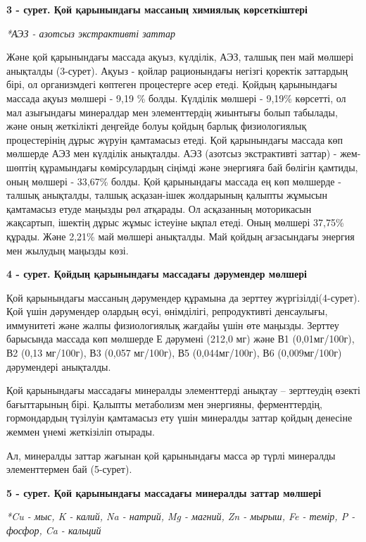 {\bfseries 3 - сурет. Қой қарынындағы массаның химиялық көрсеткіштері}

\emph{*АЭЗ - азотсыз экстрактивті заттар}

Және қой қарынындағы массада ақуыз, күлділік, АЭЗ, талшық пен май
мөлшері анықталды (3-сурет). Ақуыз - қойлар рационындағы негізгі
қоректік заттардың бірі, ол организмдегі көптеген процестерге әсер
етеді. Қойдың қарынындағы массада ақуыз мөлшері - 9,19 \% болды.
Күлділік мөлшері - 9,19\% көрсетті, ол мал азығындағы минералдар мен
элементтердің жиынтығы болып табылады, және оның жеткілікті деңгейде
болуы қойдың барлық физиологиялық процестерінің дұрыс жүруін қамтамасыз
етеді. Қой қарынындағы массада көп мөлшерде АЭЗ мен күлділік анықталды.
АЭЗ (азотсыз экстрактивті заттар) - жем-шөптің құрамындағы көмірсулардың
сіңімді және энергияға бай бөлігін қамтиды, оның мөлшері - 33,67\%
болды. Қой қарынындағы массада ең көп мөлшерде - талшық анықталды,
талшық асқазан-ішек жолдарының қалыпты жұмысын қамтамасыз етуде маңызды
рөл атқарады. Ол асқазанның моторикасын жақсартып, ішектің дұрыс жұмыс
істеуіне ықпал етеді. Оның мөлшері 37,75\% құрады. Және 2,21\% май
мөлшері анықталды. Май қойдың ағзасындағы энергия мен жылудың маңызды
көзі.

{\bfseries 4 - сурет. Қойдың қарынындағы массадағы дәрумендер мөлшері}

Қой қарынындағы массаның дәрумендер құрамына да зерттеу
жүргізілді(4-сурет). Қой үшін дәрумендер олардың өсуі, өнімділігі,
репродуктивті денсаулығы, иммунитеті және жалпы физиологиялық жағдайы
үшін өте маңызды. Зерттеу барысында массада көп мөлшерде Е дәрумені
(212,0 мг) және В1 (0,01мг/100г), В2 (0,13 мг/100г), В3 (0,057 мг/100г),
В5 (0,044мг/100г), В6 (0,009мг/100г) дәрумендері анықталды.

Қой қарынындағы массадағы минералды элементтерді анықтау -- зерттеудің
өзекті бағыттарының бірі. Қалыпты метаболизм мен энергияны,
ферменттердің, гормондардың түзілуін қамтамасыз ету үшін минералды
заттар қойдың денесіне жеммен үнемі жеткізіліп отырады.

Ал, минералды заттар жағынан қой қарынындағы масса әр түрлі минералды
элементтермен бай (5-сурет).

{\bfseries 5 - сурет. Қой қарынындағы массадағы минералды заттар мөлшері}

\emph{*Cu - мыс, K - калий, Na - натрий, Mg - магний, Zn - мырыш, Fe -
темір, P - фосфор, Ca - кальций}

